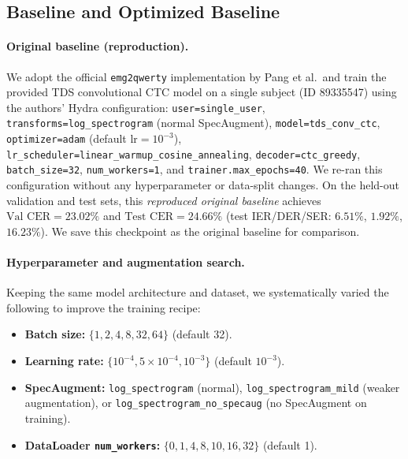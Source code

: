 
\subsection{Baseline and Optimized Baseline}

\paragraph{Original baseline (reproduction).}
We adopt the official \texttt{emg2qwerty} implementation by Pang et al.\ and train the provided TDS convolutional CTC model on a single subject (ID 89335547) using the authors' Hydra configuration: \texttt{user=single\_user}, \texttt{transforms=log\_spectrogram} (normal SpecAugment), \texttt{model=tds\_conv\_ctc}, \texttt{optimizer=adam} (default $\text{lr}=10^{-3}$), \texttt{lr\_scheduler=linear\_warmup\_cosine\_annealing}, \texttt{decoder=ctc\_greedy}, \texttt{batch\_size=32}, \texttt{num\_workers=1}, and \texttt{trainer.max\_epochs=40}. We re-ran this configuration without any hyperparameter or data-split changes. On the held-out validation and test sets, this \emph{reproduced original baseline} achieves $\text{Val CER} = 23.02\%$ and $\text{Test CER} = 24.66\%$ (test IER/DER/SER: $6.51\%$, $1.92\%$, $16.23\%$). We save this checkpoint as the original baseline for comparison.

\paragraph{Hyperparameter and augmentation search.}
Keeping the same model architecture and dataset, we systematically varied the following to improve the training recipe:

\begin{itemize}
    \item \textbf{Batch size:} $\{1, 2, 4, 8, 32, 64\}$ (default 32).
    \item \textbf{Learning rate:} $\{10^{-4}, 5\times10^{-4}, 10^{-3}\}$ (default $10^{-3}$).
    \item \textbf{SpecAugment:} \texttt{log\_spectrogram} (normal), \texttt{log\_spectrogram\_mild} (weaker augmentation), or \texttt{log\_spectrogram\_no\_specaug} (no SpecAugment on training).
    \item \textbf{DataLoader \texttt{num\_workers}:} $\{0, 1, 4, 8, 10, 16, 32\}$ (default 1).
\end{itemize}

